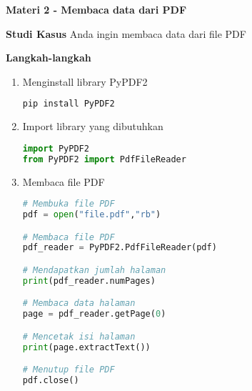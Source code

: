 \documentclass{article}
\begin{document}
    \begin{flushleft}
        \textbf{Materi 2 - Membaca data dari PDF}
        \newline

        \textbf{Studi Kasus}
        \newline
        Anda ingin membaca data dari file PDF
        \newline

        \textbf{Langkah-langkah}

        \begin{enumerate}
            \item Menginstall library PyPDF2
            \lstset{style=bashstyle}
            \begin{lstlisting}[language=bash]
pip install PyPDF2
            \end{lstlisting}

            \item Import library yang dibutuhkan
            \lstset{style=pythonstyle}
            \begin{lstlisting}[language=python]
import PyPDF2
from PyPDF2 import PdfFileReader
            \end{lstlisting}

            \item Membaca file PDF
            \lstset{style=pythonstyle}
            \begin{lstlisting}[language=python]
# Membuka file PDF
pdf = open("file.pdf","rb")

# Membaca file PDF
pdf_reader = PyPDF2.PdfFileReader(pdf)

# Mendapatkan jumlah halaman
print(pdf_reader.numPages)

# Membaca data halaman
page = pdf_reader.getPage(0)

# Mencetak isi halaman
print(page.extractText())

# Menutup file PDF
pdf.close()
            \end{lstlisting}
        \end{enumerate}
    \end{flushleft}
\end{document}

